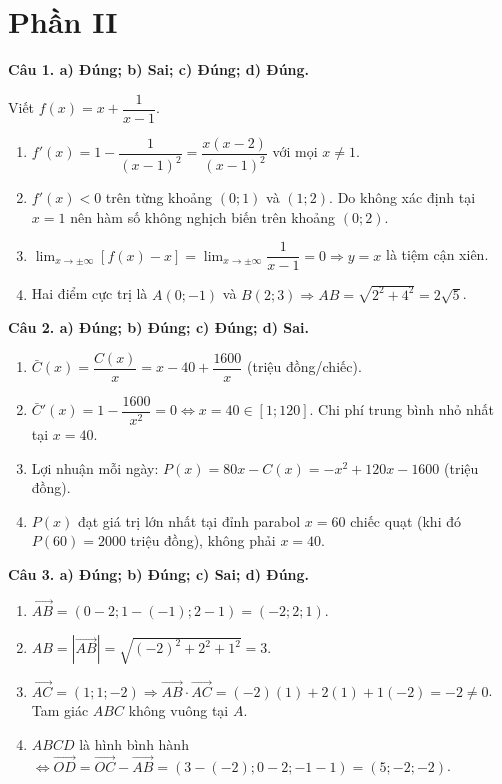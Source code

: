 \documentclass[12pt,a4paper]{article}
\newcommand{\loigiai}[1]{\par\medskip\Needspace{3\baselineskip}\noindent\textbf{#1}\par\nobreak}
\begin{document}
\section*{\large Phần II}
\loigiai{Câu 1. a) Đúng; b) Sai; c) Đúng; d) Đúng.}
Viết $f(x)=x+\dfrac{1}{x-1}$.
\begin{enumerate}[label=\alph*),leftmargin=*,itemsep=2pt]
\item $f'(x)=1-\dfrac{1}{(x-1)^2}=\dfrac{x(x-2)}{(x-1)^2}$ với mọi $x\ne1$.
\item $f'(x)<0$ trên từng khoảng $(0;1)$ và $(1;2)$. Do không xác định tại $x=1$ nên hàm số không nghịch biến trên khoảng $(0;2)$.
\item $\lim_{x\to\pm\infty}[f(x)-x]=\lim_{x\to\pm\infty}\dfrac{1}{x-1}=0\Rightarrow y=x$ là tiệm cận xiên.
\item Hai điểm cực trị là $A(0;-1)$ và $B(2;3)\Rightarrow AB=\sqrt{2^2+4^2}=2\sqrt5$.
\end{enumerate}

\loigiai{Câu 2. a) Đúng; b) Đúng; c) Đúng; d) Sai.}
\begin{enumerate}[label=\alph*),leftmargin=*,itemsep=2pt]
\item $\bar C(x)=\dfrac{C(x)}{x}=x-40+\dfrac{1600}{x}$ (triệu đồng/chiếc).
\item $\bar C'(x)=1-\dfrac{1600}{x^2}=0\Leftrightarrow x=40\in[1;120]$. Chi phí trung bình nhỏ nhất tại $x=40$.
\item Lợi nhuận mỗi ngày: $P(x)=80x-C(x)=-x^2+120x-1600$ (triệu đồng).
\item $P(x)$ đạt giá trị lớn nhất tại đỉnh parabol $x=60$ chiếc quạt (khi đó $P(60)=2000$ triệu đồng), không phải $x=40$.
\end{enumerate}

\loigiai{Câu 3. a) Đúng; b) Đúng; c) Sai; d) Đúng.}
\begin{enumerate}[label=\alph*),leftmargin=*,itemsep=2pt]
\item $\overrightarrow{AB}=(0-2;1-(-1);2-1)=(-2;2;1)$.
\item $AB=|\overrightarrow{AB}|=\sqrt{(-2)^2+2^2+1^2}=3$.
\item $\overrightarrow{AC}=(1;1;-2)\Rightarrow\overrightarrow{AB}\cdot\overrightarrow{AC}=(-2)(1)+2(1)+1(-2)=-2\ne0$. Tam giác $ABC$ không vuông tại $A$.
\item $ABCD$ là hình bình hành $\Leftrightarrow\overrightarrow{OD}=\overrightarrow{OC}-\overrightarrow{AB}=(3-(-2);0-2;-1-1)=(5;-2;-2)$.
\end{enumerate}
\end{document}
